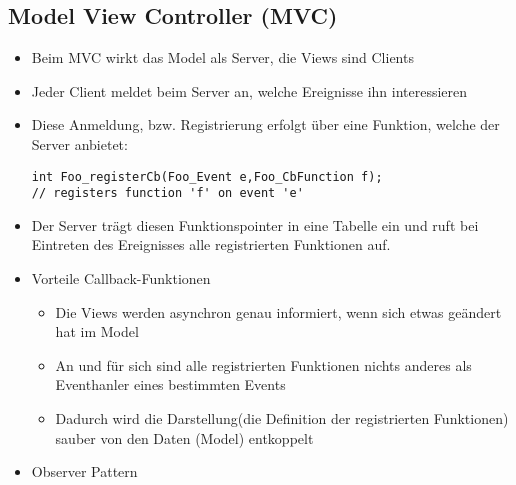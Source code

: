 \subsection{Model View Controller (MVC) }
\begin{itemize}
	\item Beim MVC wirkt das Model als Server, die Views sind Clients
	\item Jeder Client meldet beim Server an, welche Ereignisse ihn interessieren
	\item Diese Anmeldung, bzw. Registrierung erfolgt über eine Funktion, welche der Server anbietet:
	\begin{lstlisting}[style=C]
int Foo_registerCb(Foo_Event e,Foo_CbFunction f);
// registers function 'f' on event 'e'
	\end{lstlisting}
	\item Der Server trägt diesen Funktionspointer in eine Tabelle ein und ruft bei Eintreten des Ereignisses alle registrierten Funktionen auf.
	\item Vorteile Callback-Funktionen
	\begin{itemize}
		\item Die Views werden asynchron genau informiert, wenn sich etwas geändert hat im Model
		\item An und für sich sind alle registrierten Funktionen nichts anderes als Eventhanler eines bestimmten Events
		\item Dadurch wird die Darstellung(die Definition der registrierten Funktionen) sauber von den Daten (Model) entkoppelt
	\end{itemize} 
	\item Observer Pattern
\end{itemize}
